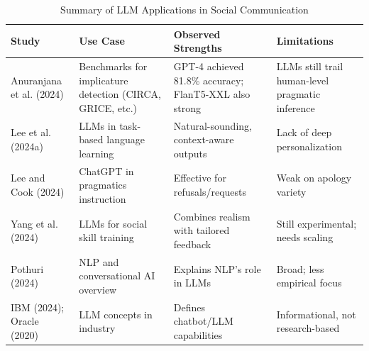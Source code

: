 \begin{table}[H]
\centering
\caption{Summary of LLM Applications in Social Communication}
\small
\begin{tabular}{p{3.3cm} p{3.7cm} p{3.7cm} p{3.7cm}}
\toprule
\textbf{Study} & \textbf{Use Case} & \textbf{Observed Strengths} & \textbf{Limitations} \\
\midrule
Anuranjana et al. (2024) & Benchmarks for implicature detection (CIRCA, GRICE, etc.) & GPT-4 achieved 81.8\% accuracy; FlanT5-XXL also strong & LLMs still trail human-level pragmatic inference \\
Lee et al. (2024a) & LLMs in task-based language learning & Natural-sounding, context-aware outputs & Lack of deep personalization \\
Lee and Cook (2024) & ChatGPT in pragmatics instruction & Effective for refusals/requests & Weak on apology variety \\
Yang et al. (2024) & LLMs for social skill training & Combines realism with tailored feedback & Still experimental; needs scaling \\
Pothuri (2024) & NLP and conversational AI overview & Explains NLP’s role in LLMs & Broad; less empirical focus \\
IBM (2024); Oracle (2020) & LLM concepts in industry & Defines chatbot/LLM capabilities & Informational, not research-based \\
\bottomrule
\end{tabular}
\end{table}

